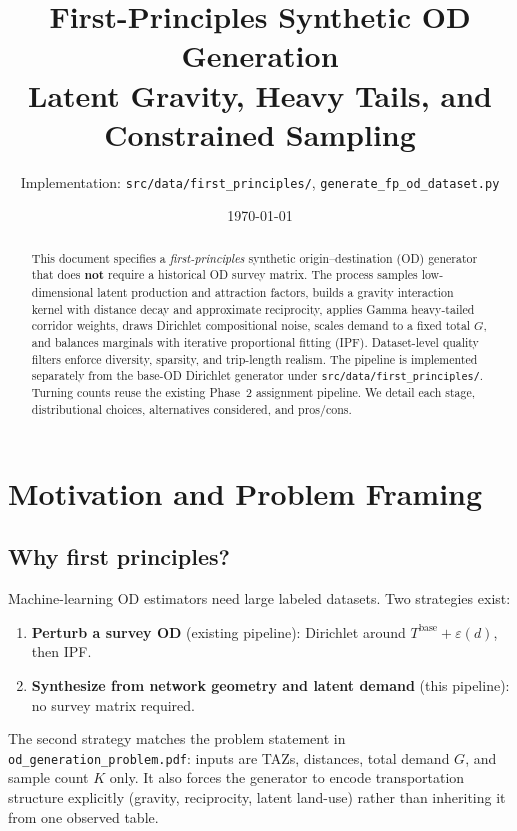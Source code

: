 \documentclass[11pt,a4paper]{report}
\title{First-Principles Synthetic OD Generation\\[0.4em]
\large Latent Gravity, Heavy Tails, and Constrained Sampling}
\author{Implementation: \texttt{src/data/first\_principles/}, \texttt{generate\_fp\_od\_dataset.py}}
\date{\today}
\begin{document}
\maketitle

\begin{abstract}
This document specifies a \emph{first-principles} synthetic origin--destination (OD) generator that does \textbf{not} require a historical OD survey matrix. The process samples low-dimensional latent production and attraction factors, builds a gravity interaction kernel with distance decay and approximate reciprocity, applies Gamma heavy-tailed corridor weights, draws Dirichlet compositional noise, scales demand to a fixed total $G$, and balances marginals with iterative proportional fitting (IPF). Dataset-level quality filters enforce diversity, sparsity, and trip-length realism. The pipeline is implemented separately from the base-OD Dirichlet generator under \texttt{src/data/first\_principles/}. Turning counts reuse the existing Phase~2 assignment pipeline. We detail each stage, distributional choices, alternatives considered, and pros/cons.
\end{abstract}

\tableofcontents

\chapter{Motivation and Problem Framing}
\label{ch:fp-motivation}

\section{Why first principles?}

Machine-learning OD estimators need large labeled datasets. Two strategies exist:

\begin{enumerate}[leftmargin=*]
    \item \textbf{Perturb a survey OD} (existing pipeline): Dirichlet around $T^{\mathrm{base}}+\varepsilon(d)$, then IPF.
    \item \textbf{Synthesize from network geometry and latent demand} (this pipeline): no survey matrix required.
\end{enumerate}

The second strategy matches the problem statement in \texttt{od\_generation\_problem.pdf}: inputs are TAZs, distances, total demand $G$, and sample count $K$ only. It also forces the generator to encode transportation structure explicitly (gravity, reciprocity, latent land-use) rather than inheriting it from one observed table.
\end{document}
